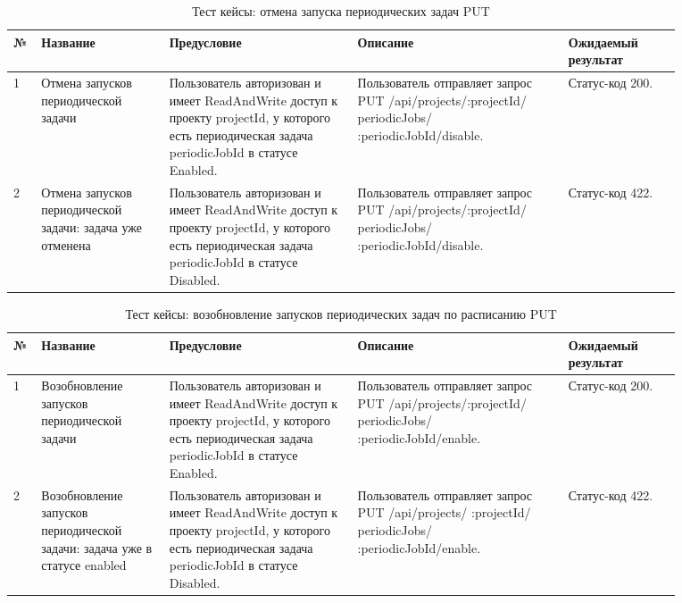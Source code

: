 \documentclass[a4paper,12pt]{article}
\begin{document}
	\begin{table}[hbt]
		\centering
		\begin{tabular}{|p{0.02\linewidth}|p{0.17\linewidth}|p{0.25\linewidth}|p{0.28\linewidth}|p{0.15\linewidth}|} 
			\hline
			\textbf{№} & \textbf{Название} & \textbf{Предусловие} & \textbf{Описание} & \textbf{Ожидаемый результат} \\ \hline
			
			1 & Отмена запусков периодической задачи & Пользователь авторизован и имеет ReadAndWrite доступ к проекту projectId, у которого есть периодическая задача periodicJobId в статусе Enabled. & Пользователь отправляет запрос PUT      /api/projects/:projectId/ periodicJobs/ :periodicJobId/disable. & Статус-код 200. \\ \hline
	
	        2 & Отмена запусков периодической задачи: задача уже отменена & Пользователь авторизован и имеет ReadAndWrite доступ к проекту projectId, у которого есть периодическая задача periodicJobId в статусе Disabled. & Пользователь отправляет запрос PUT      /api/projects/:projectId/ periodicJobs/ :periodicJobId/disable. &  Статус-код 422.  \\ \hline
	        
	\end{tabular}
	\caption{Тест кейсы: отмена запуска периодических задач PUT}
	\end{table} 
	
	\begin{table}[hbt]
		\centering
		\begin{tabular}{|p{0.02\linewidth}|p{0.17\linewidth}|p{0.25\linewidth}|p{0.28\linewidth}|p{0.15\linewidth}|} 
			\hline
			\textbf{№} & \textbf{Название} & \textbf{Предусловие} & \textbf{Описание} & \textbf{Ожидаемый результат} \\ \hline
			
			1 & Возобновление запусков периодической задачи & Пользователь авторизован и имеет ReadAndWrite доступ к проекту projectId, у которого есть периодическая задача periodicJobId в статусе Enabled. & Пользователь отправляет запрос PUT      /api/projects/:projectId/ periodicJobs/ :periodicJobId/enable. & Статус-код 200. \\ \hline
	
	        2 & Возобновление запусков периодической задачи: задача уже в статусе enabled & Пользователь авторизован и имеет ReadAndWrite доступ к проекту projectId, у которого есть периодическая задача periodicJobId в статусе Disabled. & Пользователь отправляет запрос PUT      /api/projects/ :projectId/ periodicJobs/ :periodicJobId/enable. &  Статус-код 422.  \\ \hline
	        
	\end{tabular}
	\caption{Тест кейсы: возобновление запусков периодических задач по расписанию PUT}
	\end{table} 
	
\end{document}
